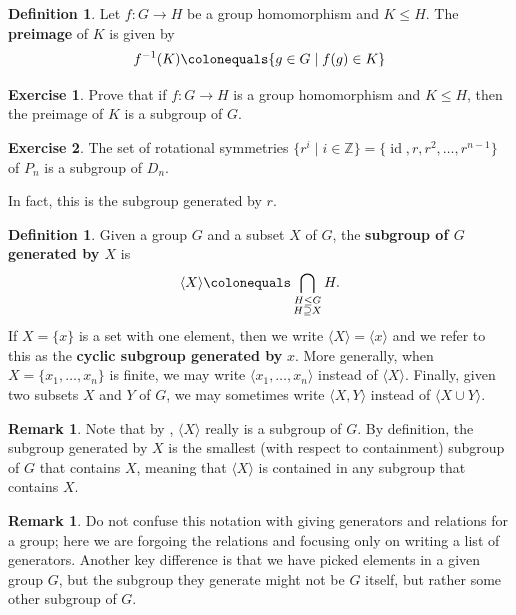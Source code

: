 \documentclass[12pt]{report}
\numberwithin{equation}{section}
\numberwithin{theorem}{chapter}
\theoremstyle{definition}
\newtheorem{definition}[theorem]{Definition}
\newtheorem{exercise}{Exercise}
\newtheorem*{basic properties}{Basic Properties}
\newtheorem*{Important Remark}{Important Remark}
\newtheorem{remark}[theorem]{Remark}
\newcommand{\Z}{\mathbb{Z}}
\DeclareMathOperator{\id}{id}
\begin{document}
\begin{definition}
Let $f\!:G\to H$ be a group homomorphism and $K\leq H$. The {\bf preimage} of $K$ is given by
$$f^{-1}(K) \colonequals \{g\in G \mid f(g)\in K\}$$
\end{definition}


\begin{exercise}\label{preimage is a subgroup}
Prove that if $f\!:G\to H$ is a group homomorphism and $K\leq H$, then the preimage of $K$ is a subgroup of $G$.
\end{exercise}




\begin{exercise}\label{rotations subgroup of D_n}
	The set of rotational symmetries $\{ r^i \mid i \in \Z \} = \{\id, r, r^2, \dots, r^{n-1}\}$ of $P_n$ is a subgroup of $D_{n}$.
\end{exercise}


In fact, this is the subgroup generated by $r$.


\begin{definition}
Given a group $G$ and a subset $X$ of $G$, the {\bf subgroup of $G$ generated by $X$} is
$$\langle X \rangle \colonequals \bigcap_{\substack{H \leq G \\ H \supseteq X}} H.$$
If $X=\{x\}$ is a set with one element, then we write $\langle X \rangle=\langle x \rangle$ and we refer to this as the {\bf cyclic subgroup generated by} $x$. More generally, when $X = \{ x_1, \ldots, x_n \}$ is finite, we may write $\langle x_1, \ldots, x_n \rangle$ instead of $\langle X \rangle$. Finally, given two subsets $X$ and $Y$ of $G$, we may sometimes write $\langle X, Y \rangle$ instead of $\langle X \cup Y \rangle$.
\end{definition}


\begin{remark}
Note that by , $\langle X \rangle$ really is a subgroup of $G$. By definition, the subgroup generated by $X$ is the smallest (with respect to containment) subgroup of $G$ that contains $X$, meaning that $\langle X \rangle$ is contained in any subgroup that contains $X$.
\end{remark}


\begin{remark}
	Do not confuse this notation with giving generators and relations for a group; here we are forgoing the relations and focusing only on writing a list of generators. Another key difference is that we have picked elements in a given group $G$, but the subgroup they generate might not be $G$ itself, but rather some other subgroup of $G$.
\end{remark}
\end{document}
